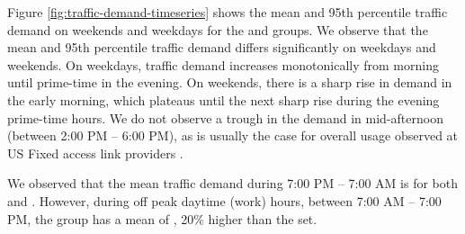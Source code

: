 Figure \ref{fig:traffic-demand-timeseries} shows the mean and 95th percentile
traffic demand on weekends and weekdays for the \treatment{} and \control{}
groups. We observe that the mean and 95th percentile traffic demand differs
significantly on weekdays and weekends. On weekdays, traffic demand 
increases monotonically from morning until prime-time in the evening. On 
weekends, there is a sharp rise in demand in the early morning, which 
plateaus until the next sharp rise during the evening prime-time hours.
We do not observe a trough in the demand in mid-afternoon 
(between 2:00 PM -- 6:00 PM), as is usually the case for overall usage observed 
at US Fixed access link providers \cite{sandvine20141h}.

We observed that the mean traffic demand during 7:00 PM -- 7:00 AM is 
 for both \treatment{} and \control{}. However, during off peak 
daytime (work) hours, between 7:00 AM -- 7:00 PM, the \treatment{} group has a 
mean of , 20\% higher than the \control{} set.

